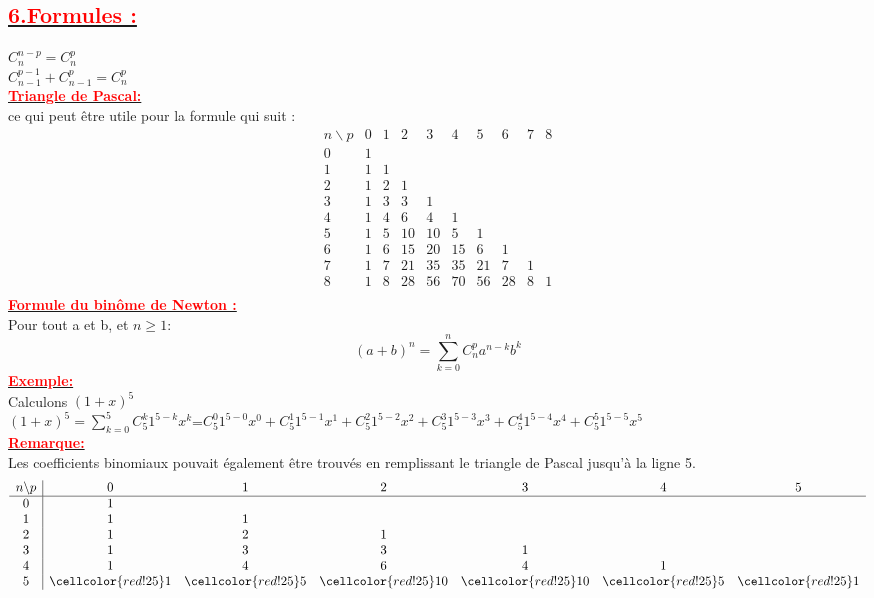 \documentclass[12pt]{article}
\begin{document}
\subsection*{\underline{\textbf{\textcolor{red}{6.Formules :}}}}
$C^{n-p}_{n}=C^{p}_{n}$\\
$C^{p-1}_{n-1}+C^{p}_{n-1}=C^{p}_{n}$\\
\underline{\textbf{\textcolor{red}{Triangle de Pascal:}}}\\
ce qui peut être utile pour la formule qui suit : \\
\begin{equation*}
\begin{array}{c|ccccccccc}
n \backslash p & 0 & 1 & 2 & 3 & 4 & 5 & 6 & 7 & 8 \\
\hline
0 & 1 \\
1 & 1 & 1 \\
2 & 1 & 2 & 1 \\
3 & 1 & 3 & 3 & 1 \\
4 & 1 & 4 & 6 & 4 & 1 \\
5 & 1 & 5 & 10 & 10 & 5 & 1 \\
6 & 1 & 6 & 15 & 20 & 15 & 6 & 1 \\
7 & 1 & 7 & 21 & 35 & 35 & 21 & 7 & 1 \\
8 & 1 & 8 & 28 & 56 & 70 & 56 & 28 & 8 & 1 \\
\end{array}
\end{equation*}
\underline{\textbf{\textcolor{red}{Formule du binôme de Newton :}}}\\
Pour tout a et b, et $n\geq 1$:\\
\[(a+b)^{n}=\sum_{k=0}^{n}C_{n}^{p}a^{n-k}b^{k}\]
\underline{\textbf{\textcolor{red}{Exemple:}}}\\
Calculons $(1+x)^{5}$\\
$(1+x)^{5}=\sum_{k=0}^{5}C_{5}^{k}1^{5-k}x^{k}$=$C_{5}^{0}1^{5-0}x^{0}+C_{5}^{1}1^{5-1}x^{1}+C_{5}^{2}1^{5-2}x^{2}+C_{5}^{3}1^{5-3}x^{3}+C_{5}^{4}1^{5-4}x^{4}+C_{5}^{5}1^{5-5}x^{5}$\\
\underline{\textbf{\textcolor{red}{Remarque:}}}\\
Les coefficients binomiaux pouvait également être trouvés en remplissant le triangle de Pascal jusqu’à la ligne 5. 
\begin{equation*}
\begin{array}{c|cccccc}
n \backslash p & 0 & 1 & 2 & 3 & 4 & 5 \\
\hline
0 & 1 \\
1 & 1 & 1 \\
2 & 1 & 2 & 1 \\
3 & 1 & 3 & 3 & 1 \\
4 & 1 & 4 & 6 & 4 & 1 \\
5 & \cellcolor{red!25}1 & \cellcolor{red!25}5 & \cellcolor{red!25}10 & \cellcolor{red!25}10 & \cellcolor{red!25}5 & \cellcolor{red!25}1 \\
\end{array}
\end{equation*}
\end{document}
